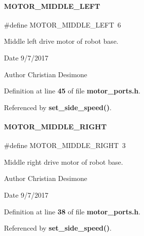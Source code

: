 \paragraph{M\+O\+T\+O\+R\+\_\+\+M\+I\+D\+D\+L\+E\+\_\+\+L\+E\+FT}
{\footnotesize\ttfamily \#define M\+O\+T\+O\+R\+\_\+\+M\+I\+D\+D\+L\+E\+\_\+\+L\+E\+FT~6}



Middle left drive motor of robot base. 

\begin{DoxyDate}{Date}
9/7/2017 
\end{DoxyDate}
\begin{DoxyAuthor}{Author}
Christian Desimone 
\end{DoxyAuthor}


Definition at line \textbf{ 45} of file \textbf{ motor\+\_\+ports.\+h}.



Referenced by \textbf{ set\+\_\+side\+\_\+speed()}.

\mbox{\label{a00050_a0da3f792b8f28ab09b339295859d8334}} 
\paragraph{M\+O\+T\+O\+R\+\_\+\+M\+I\+D\+D\+L\+E\+\_\+\+R\+I\+G\+HT}
{\footnotesize\ttfamily \#define M\+O\+T\+O\+R\+\_\+\+M\+I\+D\+D\+L\+E\+\_\+\+R\+I\+G\+HT~3}



Middle right drive motor of robot base. 

\begin{DoxyAuthor}{Author}
Christian Desimone 
\end{DoxyAuthor}
\begin{DoxyDate}{Date}
9/7/2017 
\end{DoxyDate}


Definition at line \textbf{ 38} of file \textbf{ motor\+\_\+ports.\+h}.



Referenced by \textbf{ set\+\_\+side\+\_\+speed()}.

\mbox{\label{a00050_a85596f3eea4e187ef652eac88014726f}} 
